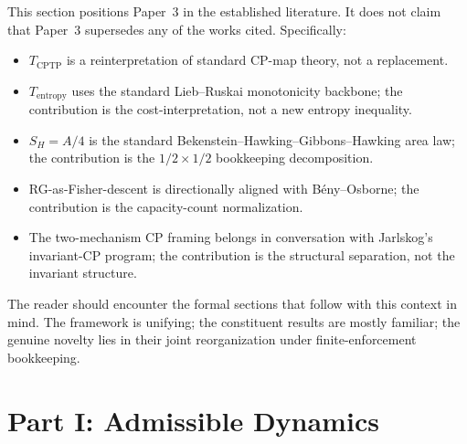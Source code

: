 \documentclass[11pt]{article}
\begin{document}
This section positions Paper~3 in the established literature.  It does not
claim that Paper~3 supersedes any of the works cited.  Specifically:

\begin{itemize}
    \item $T_{\mathrm{CPTP}}$ is a reinterpretation of standard CP-map theory, not a replacement.
    \item $T_{\mathrm{entropy}}$ uses the standard Lieb--Ruskai monotonicity backbone; the contribution is the cost-interpretation, not a new entropy inequality.
    \item $S_H = A/4$ is the standard Bekenstein--Hawking--Gibbons--Hawking area law; the contribution is the $1/2 \times 1/2$ bookkeeping decomposition.
    \item RG-as-Fisher-descent is directionally aligned with B\'eny--Osborne; the contribution is the capacity-count normalization.
    \item The two-mechanism CP framing belongs in conversation with Jarlskog's invariant-CP program; the contribution is the structural separation, not the invariant structure.
\end{itemize}

\noindent The reader should encounter the formal sections that follow with this
context in mind.  The framework is unifying; the constituent results are
mostly familiar; the genuine novelty lies in their joint reorganization
under finite-enforcement bookkeeping.


\section{Part I: Admissible Dynamics}

\setcounter{subsection}{0}
\end{document}

